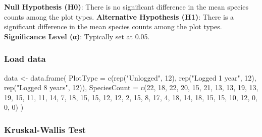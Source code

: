 \documentclass[
]{article}
\newenvironment{Shaded}{\begin{snugshade}}{\end{snugshade}}
\newcommand{\AttributeTok}[1]{\textcolor[rgb]{0.77,0.63,0.00}{#1}}
\newcommand{\DecValTok}[1]{\textcolor[rgb]{0.00,0.00,0.81}{#1}}
\newcommand{\FunctionTok}[1]{\textcolor[rgb]{0.00,0.00,0.00}{#1}}
\newcommand{\NormalTok}[1]{#1}
\newcommand{\OtherTok}[1]{\textcolor[rgb]{0.56,0.35,0.01}{#1}}
\newcommand{\StringTok}[1]{\textcolor[rgb]{0.31,0.60,0.02}{#1}}
\begin{document}
\textbf{Null Hypothesis (H0)}: There is no significant difference in the
mean species counts among the plot types. \textbf{Alternative Hypothesis
(H1)}: There is a significant difference in the mean species counts
among the plot types. \textbf{Significance Level (α)}: Typically set at
0.05.

\hypertarget{load-data-4}{%
\subsubsection{Load data}\label{load-data-4}}

\begin{Shaded}
\begin{Highlighting}[]
\NormalTok{data }\OtherTok{\textless{}{-}} \FunctionTok{data.frame}\NormalTok{(}
  \AttributeTok{PlotType =} \FunctionTok{c}\NormalTok{(}\FunctionTok{rep}\NormalTok{(}\StringTok{"Unlogged"}\NormalTok{, }\DecValTok{12}\NormalTok{), }\FunctionTok{rep}\NormalTok{(}\StringTok{"Logged 1 year"}\NormalTok{, }\DecValTok{12}\NormalTok{), }\FunctionTok{rep}\NormalTok{(}\StringTok{"Logged 8 years"}\NormalTok{, }\DecValTok{12}\NormalTok{)),}
  \AttributeTok{SpeciesCount =} \FunctionTok{c}\NormalTok{(}\DecValTok{22}\NormalTok{, }\DecValTok{18}\NormalTok{, }\DecValTok{22}\NormalTok{, }\DecValTok{20}\NormalTok{, }\DecValTok{15}\NormalTok{, }\DecValTok{21}\NormalTok{, }\DecValTok{13}\NormalTok{, }\DecValTok{13}\NormalTok{, }\DecValTok{19}\NormalTok{, }\DecValTok{13}\NormalTok{, }\DecValTok{19}\NormalTok{, }\DecValTok{15}\NormalTok{, }\DecValTok{11}\NormalTok{, }\DecValTok{11}\NormalTok{, }\DecValTok{14}\NormalTok{, }\DecValTok{7}\NormalTok{, }\DecValTok{18}\NormalTok{, }\DecValTok{15}\NormalTok{, }\DecValTok{15}\NormalTok{, }\DecValTok{12}\NormalTok{, }\DecValTok{12}\NormalTok{, }\DecValTok{2}\NormalTok{, }\DecValTok{15}\NormalTok{, }\DecValTok{8}\NormalTok{, }\DecValTok{17}\NormalTok{, }\DecValTok{4}\NormalTok{, }\DecValTok{18}\NormalTok{, }\DecValTok{14}\NormalTok{, }\DecValTok{18}\NormalTok{, }\DecValTok{15}\NormalTok{, }\DecValTok{15}\NormalTok{, }\DecValTok{10}\NormalTok{, }\DecValTok{12}\NormalTok{, }\DecValTok{0}\NormalTok{, }\DecValTok{0}\NormalTok{, }\DecValTok{0}\NormalTok{)}
\NormalTok{)}
\end{Highlighting}
\end{Shaded}

\hypertarget{kruskal-wallis-test}{%
\subsubsection{Kruskal-Wallis Test}\label{kruskal-wallis-test}}
\end{document}

